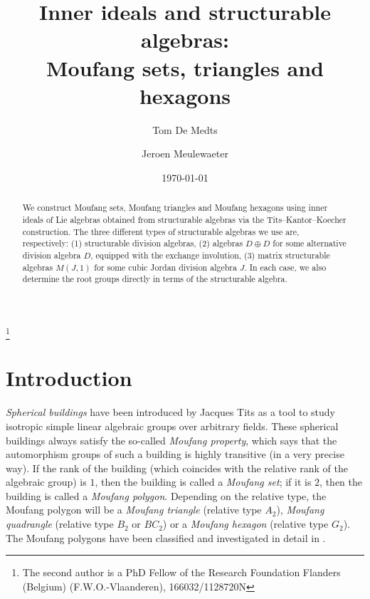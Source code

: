 \documentclass[oneside,a4paper]{amsart} %
\theoremstyle{definition}
\numberwithin{equation}{section}
\begin{document}
\title[Inner ideals and structurable algebras]{Inner ideals and structurable algebras: \\ Moufang sets, triangles and hexagons}

\author{Tom De Medts}
\address[T. De Medts and J. Meulewaeter]{Department of Mathematics: Algebra and Geometry, Ghent University, Krijgslaan 281--S25, 9000 Gent\\Belgium}

\author{Jeroen Meulewaeter}
\thanks{The second author is a PhD Fellow of the Research Foundation Flanders (Belgium) (F.W.O.-Vlaanderen), 166032/1128720N}

\date{\today}

\begin{abstract}
    We construct Moufang sets, Moufang triangles and Moufang hexagons using inner ideals of Lie algebras obtained from structurable algebras via the Tits--Kantor--Koecher construction. The three different types of structurable algebras we use are, respectively:
    (1) structurable division algebras,
    (2) algebras $D \oplus D$ for some alternative division algebra $D$, equipped with the exchange involution,
    (3) matrix structurable algebras $M(J,1)$ for some cubic Jordan division algebra $J$.
    In each case, we also determine the root groups directly in terms of the structurable algebra.
\end{abstract}

\maketitle

\section{Introduction}

\emph{Spherical buildings} have been introduced by Jacques Tits \cite{Tits1974} as a tool to study isotropic simple linear algebraic groups over arbitrary fields. These spherical buildings always satisfy the so-called \emph{Moufang property}, which says that the automorphism groups of such a building is highly transitive (in a very precise way). If the rank of the building (which coincides with the relative rank of the algebraic group) is $1$, then the building is called a \emph{Moufang set}; if it is $2$, then the building is called a \emph{Moufang polygon}.
Depending on the relative type, the Moufang polygon will be a \emph{Moufang triangle} (relative type $A_2$), \emph{Moufang quadrangle} (relative type $B_2$ or $BC_2$) or a \emph{Moufang hexagon} (relative type $G_2$).
The Moufang polygons have been classified and investigated in detail in \cite{Tits2002}.
\end{document}
